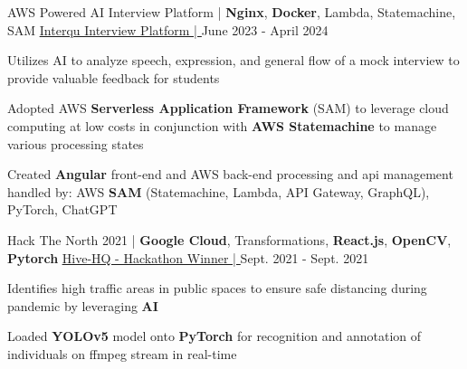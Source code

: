 \begin{cventries}
	\cventry
	{AWS Powered AI Interview Platform | \textbf{Nginx}, \textbf{Docker}, Lambda, Statemachine, SAM}
	{\underline{\href{https://github.com/Interqu}{Interqu Interview Platform | \ExternalLink}}} %
	{} %
	{June 2023 - April 2024} %
	{
		\begin{cvitems} %
			\item {Utilizes AI to analyze speech, expression, and general flow of a mock interview to provide valuable feedback for students}
      \item {Adopted AWS \textbf{Serverless Application Framework} (SAM) to leverage cloud computing at low costs in conjunction with \textbf{AWS Statemachine} to manage various processing states}
			\item {Created \textbf{Angular} front-end and AWS back-end processing and api management handled by: AWS \textbf{SAM} (Statemachine, Lambda, API Gateway, GraphQL), PyTorch, ChatGPT}
		\end{cvitems}
	}

	\cventry
	{Hack The North 2021 | \textbf{Google Cloud}, Transformations, \textbf{React.js}, \textbf{OpenCV}, \textbf{Pytorch}}
	{\underline{\href{https://devpost.com/software/hive-hq}{Hive-HQ - Hackathon Winner | \ExternalLink}}} %
	{} %
	{Sept. 2021 - Sept. 2021} %
	{
		\begin{cvitems} %
    \item {Identifies high traffic areas in public spaces to ensure safe distancing during pandemic by leveraging \textbf{AI}}
			\item {Loaded \textbf{YOLOv5} model onto \textbf{PyTorch} for recognition and annotation of individuals on ffmpeg stream in real-time}
		\end{cvitems}
	}






\end{cventries}
